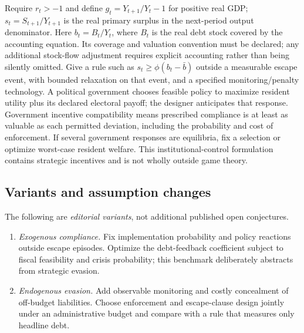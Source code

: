 \documentclass[11pt,a4paper]{article}
\begin{document}
Require \(r_t>-1\) and define \(g_t=Y_{t+1}/Y_t-1\) for positive real GDP; \(s_t=S_{t+1}/Y_{t+1}\) is the real primary surplus in the next-period output denominator. Here \(b_t=B_t/Y_t\), where \(B_t\) is the real debt stock covered by the accounting equation. Its coverage and valuation convention must be declared; any additional stock-flow adjustment requires explicit accounting rather than being silently omitted. Give a rule such as \(s_t\ge\phi(b_t-\bar b)\) outside a measurable escape event, with bounded relaxation on that event, and a specified monitoring/penalty technology. A political government chooses feasible policy to maximize resident utility plus its declared electoral payoff; the designer anticipates that response. Government incentive compatibility means prescribed compliance is at least as valuable as each permitted deviation, including the probability and cost of enforcement. If several government responses are equilibria, fix a selection or optimize worst-case resident welfare. This institutional-control formulation contains strategic incentives and is not wholly outside game theory.
\subsection*{Variants and assumption changes}
The following are \emph{editorial variants}, not additional published open conjectures.
\begin{enumerate}
\item \emph{Exogenous compliance.} Fix implementation probability and policy reactions outside escape episodes. Optimize the debt-feedback coefficient subject to fiscal feasibility and crisis probability; this benchmark deliberately abstracts from strategic evasion.
\item \emph{Endogenous evasion.} Add observable monitoring and costly concealment of off-budget liabilities. Choose enforcement and escape-clause design jointly under an administrative budget and compare with a rule that measures only headline debt.
\end{enumerate}
\end{document}
